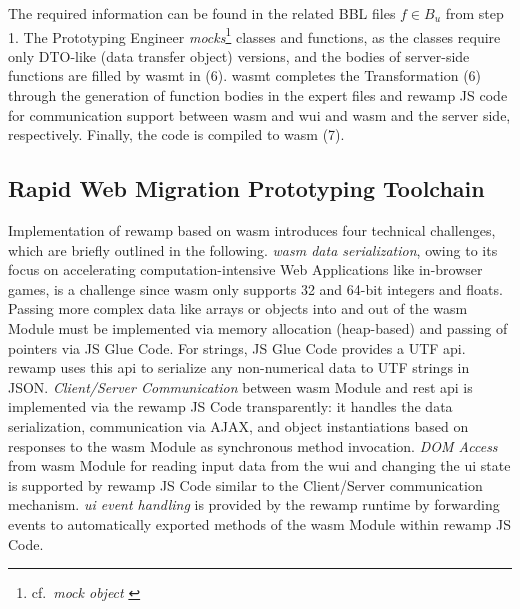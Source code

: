 The required information can be found in the related BBL files \(f\in B_u\) from step 1.
The Prototyping Engineer \emph{mocks}\footnote{cf.~\emph{mock object} \autocite{ISO/IEEE24765Vocabulary}} classes and functions, as the classes require only DTO-like (data transfer object) versions, and the bodies of server-side functions are filled by \gls{wasmt} in (6).
\gls{wasmt} completes the \gls{Transformation} (6) through the generation of function bodies in the expert files and \gls{rewamp} JS code for communication support between \gls{wasm} and \gls{wui} and \gls{wasm} and the server side, respectively.
Finally, the code is compiled to \gls{wasm} (7).

\pagebreak
\hypertarget{sec:rewamp.implementation}{%
\subsection{Rapid Web Migration Prototyping Toolchain}\label{sec:rewamp.implementation}}
\vspace{10pt}

Implementation of \gls{rewamp} based on \gls{wasm} introduces four technical challenges, which are briefly outlined in the following.
\emph{\gls{wasm} data serialization}, owing to its focus on accelerating computation-intensive \glspl{Web Application} like in-browser games, is a challenge since \gls{wasm} only supports 32 and 64-bit integers and floats.
Passing more complex data like arrays or objects into and out of the \gls{wasm} Module must be implemented via memory allocation (heap-based) and passing of pointers via JS Glue Code.
For strings, JS Glue Code provides a UTF \gls{api}.
\gls{rewamp} uses this \gls{api} to serialize any non-numerical data to UTF strings in JSON.
\emph{Client/Server Communication} between \gls{wasm} Module and \gls{rest} \gls{api} is implemented via the \gls{rewamp} JS Code transparently: it handles the data serialization, communication via AJAX, and object instantiations based on responses to the \gls{wasm} Module as synchronous method invocation.
\emph{DOM Access} from \gls{wasm} Module for reading input data from the \gls{wui} and changing the \gls{ui} state is supported by \gls{rewamp} JS Code similar to the Client/Server communication mechanism.
\emph{\gls{ui} event handling} is provided by the \gls{rewamp} runtime by forwarding events to automatically exported methods of the \gls{wasm} Module within \gls{rewamp} JS Code.


